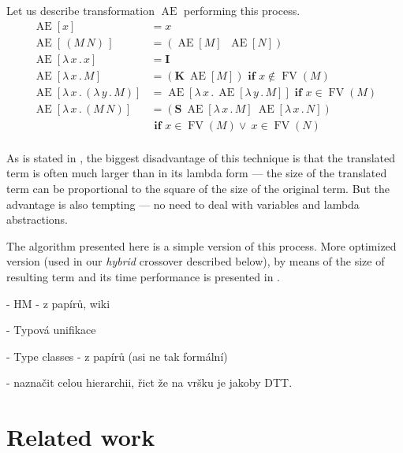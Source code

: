 \documentclass[11pt]{article}
\newcommand{\Lets}{Let us\xspace}
\newcommand{\lamb}[2]{( \lambda \, #1 \, . \, #2 )}
\newcommand{\lam}[2]{\lambda \, #1 \, . \, #2}
\newcommand{\FV}{\mathop{\mathrm{FV}}}
\newcommand{\Scomb }{\mathbf{S}}
\newcommand{\Kcomb }{\mathbf{K}}
\newcommand{\Icomb }{\mathbf{I}}
\newcommand{\Ae}{\mathop{\mathrm{AE}}} %
\newcommand{\red}[1]{{\color{red} #1}}
\begin{document}
\begin{article}
\Lets describe transformation $\Ae$ performing this 
process.
\begin{align*}
\Ae[x]           &= x\\[0.4em]
\Ae[\,(M\,N)\,]  &= (\Ae[M]\;\;\Ae[N])\\[0.4em]
\Ae[\lam{x}{x}]  &= \Icomb\\
\Ae[\lam{x}{M}]  &= (\Kcomb~\Ae[M]) \textbf{ if } x \not\in \FV(M)\\
\Ae[\lam{x}{\lamb{y}{M}}] &= \Ae[\lam{x}{\Ae[\lam{y}{M}]}]  \textbf{ if } x \in \FV(M)\\
\Ae[\lam{x}{(M\,N)}] &= (\Scomb~\Ae[\lam{x}{M}]~\Ae[\lam{x}{N}])\\
&\textbf{ if } x \in \FV(M) \vee~ x \in \FV(N)\\
\end{align*}

As is stated in \citep{jones87},
the biggest disadvantage of this technique is that the translated
term is often much larger than in its lambda form --- the size of
the translated term can be proportional to the square of the size 
of the original term. But the advantage is also tempting --- no need to deal with variables and lambda abstractions.

The algorithm presented here is a simple version of this process. 
More optimized version (used in our \textit{hybrid} cross\-over described below), by means of the size of resulting term and its time performance is presented in \citep{jones87}. 


\red{- HM - z papírů, wiki}

\red{- Typová unifikace}

\red{- Type classes - z papírů (asi ne tak formální)}

\red{- naznačit celou hierarchii, řict že na vršku je jakoby DTT.}

\section{Related work}
\label{related}


\end{article}
\end{document}
